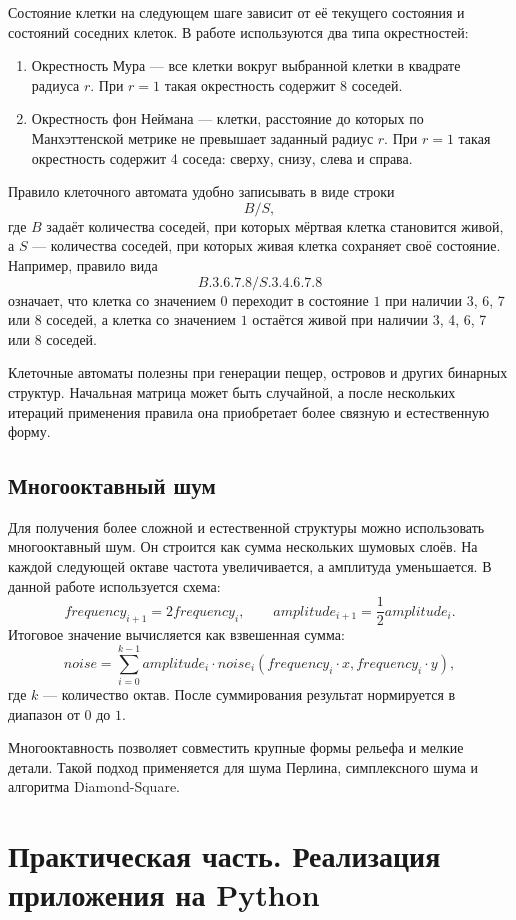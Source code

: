 Состояние клетки на следующем шаге зависит от её текущего состояния и состояний соседних клеток. В работе используются два типа окрестностей:
\begin{enumerate}
    \item Окрестность Мура --- все клетки вокруг выбранной клетки в квадрате радиуса $r$. При $r=1$ такая окрестность содержит 8 соседей.
    \item Окрестность фон Неймана --- клетки, расстояние до которых по Манхэттенской метрике не превышает заданный радиус $r$. При $r=1$ такая окрестность содержит 4 соседа: сверху, снизу, слева и справа.
\end{enumerate}

Правило клеточного автомата удобно записывать в виде строки
\[
    B/S,
\]
где $B$ задаёт количества соседей, при которых мёртвая клетка становится живой, а $S$ --- количества соседей, при которых живая клетка сохраняет своё состояние. Например, правило вида
\[
    B.3.6.7.8/S.3.4.6.7.8
\]
означает, что клетка со значением $0$ переходит в состояние $1$ при наличии 3, 6, 7 или 8 соседей, а клетка со значением $1$ остаётся живой при наличии 3, 4, 6, 7 или 8 соседей.

Клеточные автоматы полезны при генерации пещер, островов и других бинарных структур. Начальная матрица может быть случайной, а после нескольких итераций применения правила она приобретает более связную и естественную форму.

\section{Многооктавный шум}

Для получения более сложной и естественной структуры можно использовать многооктавный шум. Он строится как сумма нескольких шумовых слоёв. На каждой следующей октаве частота увеличивается, а амплитуда уменьшается. В данной работе используется схема:
\[
    frequency_{i+1}=2frequency_i, \qquad amplitude_{i+1}=\frac{1}{2}amplitude_i.
\]
Итоговое значение вычисляется как взвешенная сумма:
\[
    noise = \sum_{i=0}^{k-1} amplitude_i \cdot noise_i(frequency_i \cdot x, frequency_i \cdot y),
\]
где $k$ --- количество октав. После суммирования результат нормируется в диапазон от $0$ до $1$.

Многооктавность позволяет совместить крупные формы рельефа и мелкие детали. Такой подход применяется для шума Перлина, симплексного шума и алгоритма Diamond-Square.

\chapter{Практическая часть. Реализация приложения на Python}

